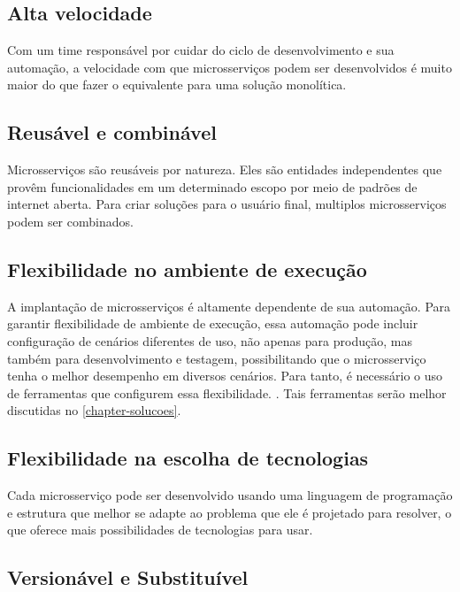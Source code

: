 \subsection{Alta velocidade}

Com um time responsável por cuidar do ciclo de desenvolvimento e sua automação, a velocidade com que microsserviços podem ser desenvolvidos é muito maior do que fazer o equivalente para uma solução monolítica. \cite{Familiar2015}

\subsection{Reusável e combinável}

Microsserviços são reusáveis por natureza. Eles são entidades independentes que provêm funcionalidades em um determinado escopo por meio de padrões de internet aberta. Para criar soluções para o usuário final, multiplos microsserviços podem ser combinados. \cite{Familiar2015}

\subsection{Flexibilidade no ambiente de execução}

A implantação de microsserviços é altamente dependente de sua automação. Para garantir flexibilidade de ambiente de execução, essa automação pode incluir configuração de cenários diferentes de uso, não apenas para produção, mas também para desenvolvimento e testagem, possibilitando que o microsserviço tenha o melhor desempenho em diversos cenários. Para tanto, é necessário o uso de ferramentas que configurem essa flexibilidade. \cite{Familiar2015}. Tais ferramentas serão melhor discutidas no \autoref{chapter-solucoes}.

\subsection{Flexibilidade na escolha de tecnologias}

Cada microsserviço pode ser desenvolvido usando uma linguagem de programação e estrutura que melhor se adapte ao problema que ele é projetado para resolver, o que oferece mais possibilidades de tecnologias para usar. \cite{oracle_microservices}

\subsection{Versionável e Substituível}

